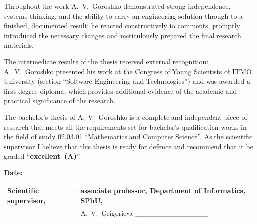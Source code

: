 \documentclass[12pt,a4paper]{article}
\begin{document}
Throughout the work A.~V.~Goroshko demonstrated strong independence,
systems thinking, and the ability to carry an engineering solution
through to a finished, documented result; he reacted constructively
to comments, promptly introduced the necessary changes and
meticulously prepared the final research materials.

The intermediate results of the thesis received external recognition:
A.~V.~Goroshko presented his work at the Congress of Young Scientists
of ITMO University (section ``Software Engineering and Technologies'')
and was awarded a first-degree diploma, which provides additional
evidence of the academic and practical significance of the research.

The bachelor's thesis of A.~V.~Goroshko is a complete and independent
piece of research that meets all the requirements set for bachelor's
qualification works in the field of study 02.03.01 ``Mathematics and
Computer Science''. As the scientific supervisor I believe that this
thesis is ready for defence and recommend that it be graded
``\textbf{excellent~(A)}''.

\vspace{1.2em}

\noindent\textbf{Date:} \_\_\_\_\_\_\_\_\_\_\_\_\_\_\_\_

\vspace{2.5em}

\noindent\begin{tabular}{@{}p{5cm}p{9cm}@{}}
\textbf{Scientific supervisor,} & \textbf{associate professor, Department of Informatics, SPbU,} \\
& A.~V.~Grigorieva \hfill \_\_\_\_\_\_\_\_\_\_\_\_\_\_
\end{tabular}
\end{document}
